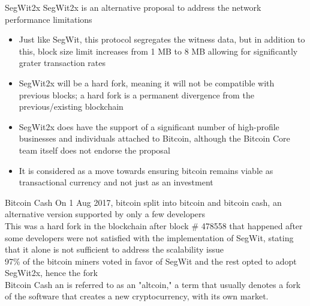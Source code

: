 \documentclass[11pt]{beamer}
\begin{document}

\begin{frame}{SegWit2x}
	SegWit2x is an alternative proposal to address the network performance limitations
	\begin{itemize}
		\item Just like SegWit, this protocol segregates the witness data, but in addition to this, block size limit increases from 1 MB to 8 MB allowing for significantly grater transaction rates
		\item SegWit2x will be a hard fork, meaning it will not be compatible with previous blocks; a hard fork is a permanent divergence from the previous/existing blockchain
		\item SegWit2x does have the support of a significant number of high-profile businesses and individuals attached to Bitcoin, although the Bitcoin Core team itself does not endorse the proposal
		\item It is considered as a move towards ensuring bitcoin remains viable as transactional currency and not just as an investment
	\end{itemize}
\end{frame}



\begin{frame}{Bitcoin Cash}
	On 1 Aug 2017, bitcoin split into bitcoin and bitcoin cash, an alternative version supported by only a few developers \\ \vspace{3mm}
	This was a hard fork in the blockchain after block \# 478558 that happened after some developers were not satisfied with the implementation of SegWit, stating that it alone is not sufficient to address the scalability issue \\ \vspace{3mm}
	97\% of the bitcoin miners voted in favor of SegWit and the rest opted to adopt SegWit2x, hence the fork\\ \vspace{3mm}
	Bitcoin Cash an is referred to as an  "altcoin," a term that usually denotes a fork of the software that creates a new cryptocurrency, with its own market. \\ \vspace{3mm}
\end{frame}
\end{document}
